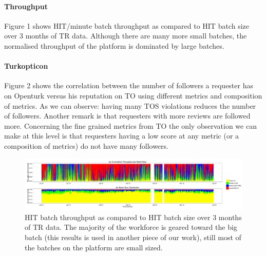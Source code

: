 \documentclass{llncs}
\begin{document}
\paragraph{Throughput} Figure 1 shows HIT/minute batch throughput as compared to HIT batch size over 3 months of TR data. Although there are many more small batches, the normalised throughput of the platform is dominated by large batches.
\paragraph{Turkopticon} Figure 2 shows the correlation between the number of followers a requester has on Openturk versus his reputation on TO using different metrics and composition of metrics.
As we can observe: having many TOS violations reduces the number of followers. Another remark is that requesters with more reviews are followed more. Concerning the fine grained metrics from TO the only observation we can make at this level is that requesters having a low score at any metric (or a composition of metrics) do not have many followers.

\begin{figure}[htbp]
	\centering
		\includegraphics[width=1.2\textwidth]{figures/analysis_hour}
	\caption{HIT batch throughput as compared to HIT batch size over 3 months of TR data. The majority of the workforce is geared toward the big batch (this results is used in another piece of our work), still most of the batches on the platform are small sized.}
	\label{fig:figure1}
\end{figure}
\end{document}
